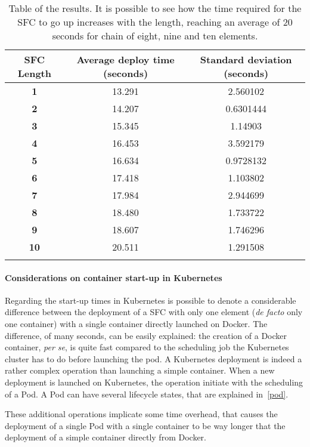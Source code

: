 \newpage

\begin{longtable}[c]{c|c|c}
\textbf{SFC Length} & \textbf{Average deploy time (seconds)} & \textbf{Standard deviation (seconds)} \\ \hline
\endfirsthead
%
\endhead
%
\textbf{1} & 13.291 & 2.560102 \\
\textbf{2} & 14.207 & 0.6301444 \\
\textbf{3} & 15.345 & 1.14903 \\
\textbf{4} & 16.453 & 3.592179 \\
\textbf{5} & 16.634 & 0.9728132 \\
\textbf{6} & 17.418 & 1.103802 \\
\textbf{7} & 17.984 & 2.944699 \\
\textbf{8} & 18.480 & 1.733722 \\
\textbf{9} & 18.607 & 1.746296 \\
\textbf{10} & 20.511 & 1.291508 \\
\caption[SFC start up time]{Table of the results. It is possible to see how the
  time required for the SFC to go up increases with the length, reaching an
  average of 20 seconds for chain of eight, nine and ten elements.}
\label{chap:tests:sec:sfclength:tab:sfcdata}\\
\end{longtable}

\paragraph*{Considerations on container start-up in Kubernetes}
Regarding the start-up times in Kubernetes is possible to denote a considerable
difference between the deployment of a SFC with only one element
(\textit{de facto} only one container) with a single container directly launched
on Docker. The difference, of many seconds, can be easily explained: the
creation of a Docker container, \textit{per se}, is quite fast compared to the
scheduling job the Kubernetes cluster has to do before launching the pod. A
Kubernetes deployment is indeed a rather complex operation than launching a
simple container. When a new deployment is launched on Kubernetes, the operation
initiate with the scheduling of a Pod. A Pod can have several lifecycle
states, that are explained in~\ref{pod}.

These additional operations implicate some time overhead, that causes the
deployment of a single Pod with a single container to be way longer that the
deployment of a simple container directly from Docker.
